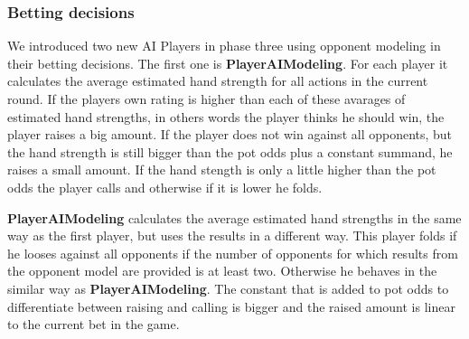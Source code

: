 \subsubsection{Betting decisions}

We introduced two new AI Players in phase three using opponent modeling in their betting decisions. The first one is \textbf{PlayerAIModeling}. For each player it calculates the average estimated hand strength for all actions in the current round. If the players own rating is higher than each of these avarages of estimated hand strengths, in others words the player thinks he should win, the player raises a big amount. If the player does not win against all opponents, but the hand strength is still bigger than the pot odds plus a constant summand, he raises a small amount. 
If the hand stength is only a little higher than the pot odds the player calls and otherwise if it is lower he folds.

\textbf{PlayerAIModeling} calculates the average estimated hand strengths in the same way as the first player, but uses the results in a different way. This player folds if he looses against all opponents if the number of opponents for which results from the opponent model are provided is at least two. Otherwise he behaves in the similar way as \textbf{PlayerAIModeling}. The constant that is added to pot odds to differentiate between raising and calling is bigger and the raised amount is linear to the current bet in the game. 



